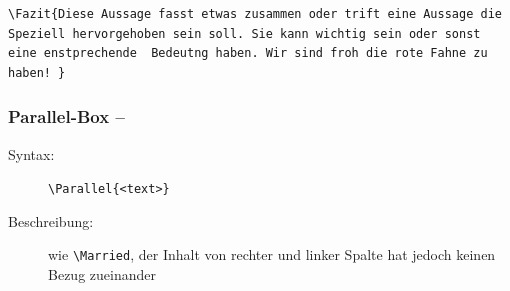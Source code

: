 \documentclass[ngerman,paper=a4,fontsize=8pt,headings=small,draft=no,parskip=half,noonelinecaption]{scrreprt}
\begin{document}
\begin{lstlisting}
\Fazit{Diese Aussage fasst etwas zusammen oder trift eine Aussage die Speziell hervorgehoben sein soll. Sie kann wichtig sein oder sonst eine enstprechende  Bedeutng haben. Wir sind froh die rote Fahne zu haben! }
\end{lstlisting}













\subsubsection{Parallel-Box -- }

\begin{description}
    \item[Syntax:] \lstinline$\Parallel{<text>}$
    \item[Beschreibung:] wie \lstinline$\Married$, der Inhalt von rechter und
linker Spalte hat jedoch keinen Bezug zueinander     
%     
\end{description}



\begin{minipage}{0.48\linewidth}


\end{minipage}
\hspace{0.04\linewidth}
\begin{minipage}{0.48\linewidth}
\begin{lstlisting}

\end{lstlisting}
\end{minipage}
\end{document}
